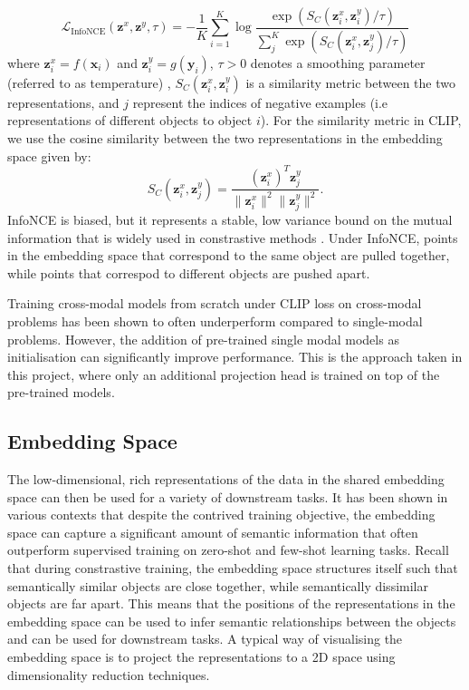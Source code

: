 \documentclass[a4paper,12pt]{article}
\begin{document}
\begin{equation}
    \mathcal{L}_{\text{InfoNCE}}(\mathbf{z}^x, \mathbf{z}^y, \tau) = -\frac{1}{K} \sum_{i=1}^{K} \log \frac{\exp\left(S_C(\mathbf{z}^x_i, \mathbf{z}^y_i)/\tau\right)}{\sum_{j}^{K} \exp\left(S_C(\mathbf{z}^x_i, \mathbf{z}^y_j)/\tau\right)}
    \label{eq:infonce}
\end{equation}
where $\mathbf{z}^x_i=f(\mathbf{x}_i)$ and $\mathbf{z}^y_i=g(\mathbf{y}_i)$, $\tau > 0$ denotes a smoothing parameter (referred to as temperature) , $S_C(\mathbf{z}^x_i, \mathbf{z}^y_i)$ is a similarity metric between the two representations, and $j$ represent the indices of negative examples (i.e representations of different objects to object $i$). For the similarity metric in CLIP, we use the cosine similarity between the two representations in the embedding space given by:
\begin{equation}
    S_C(\mathbf{z}^x_i, \mathbf{z}^y_j) = \frac{(\mathbf{z}^x_i)^T \mathbf{z}^y_j}{\|\mathbf{z}^x_i\|^2 \|\mathbf{z}^y_j\|^2}.
    \label{eq:cosine}
\end{equation}
InfoNCE is biased, but it represents a stable, low variance bound on the mutual information that is widely used in constrastive methods \cite{crossCLIP}. Under InfoNCE, points in the embedding space that correspond to the same object are pulled together, while points that correspod to different objects are pushed apart.

Training cross-modal models from scratch under CLIP loss on cross-modal problems has been shown to often underperform compared to single-modal problems. However, the addition of pre-trained single modal models as initialisation can significantly improve performance. This is the approach taken in this project, where only an additional projection head is trained on top of the pre-trained models.



\subsection{Embedding Space}
The low-dimensional, rich representations of the data in the shared embedding space can then be used for a variety of downstream tasks. It has been shown in various contexts that despite the contrived training objective, the embedding space can capture a significant amount of semantic information that often outperform supervised training on zero-shot and few-shot learning tasks. Recall that during constrastive training, the embedding space structures itself such that semantically similar objects are close together, while semantically dissimilar objects are far apart. 
This means that the positions of the representations in the embedding space can be used to infer semantic relationships between the objects and can be used for downstream tasks. A typical way of visualising the embedding space is to project the representations to a 2D space using dimensionality reduction techniques. 
\end{document}
